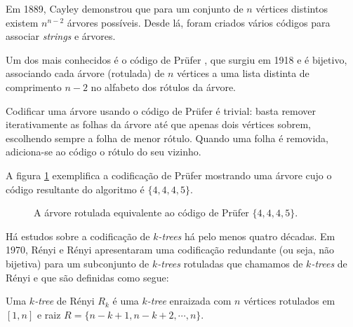 Em 1889, Cayley \cite{cayley} demonstrou que para um conjunto de $n$ vértices distintos existem $n^{n-2}$ árvores possíveis. Desde lá, foram criados vários códigos para associar \emph{strings} e árvores.

Um dos mais conhecidos é o código de Prüfer \cite{prufer}, que surgiu em 1918 e é bijetivo, associando cada árvore (rotulada) de $n$ vértices a uma lista distinta de comprimento $n-2$ no alfabeto dos rótulos da árvore.

Codificar uma árvore usando o código de Prüfer é trivial: basta remover iterativamente as folhas da árvore até que apenas dois vértices sobrem, escolhendo sempre a folha de menor rótulo. Quando uma folha é removida, adiciona-se ao código o rótulo do seu vizinho.

A figura \ref{fig:prufer} exemplifica a codificação de Prüfer mostrando uma árvore cujo o código resultante do algoritmo é $\{4, 4, 4, 5\}$.

\begin{figure}
  \centering

  \caption{A árvore rotulada equivalente ao código de Prüfer $\{4, 4, 4, 5\}$.}
  \label{fig:prufer}
\end{figure}

\vspace{2em}

Há estudos sobre a codificação de \emph{$k$-trees} há pelo menos quatro décadas. Em 1970, Rényi e Rényi apresentaram uma codificação redundante (ou seja, não bijetiva) para um subconjunto de \emph{$k$-trees} rotuladas que chamamos de \emph{$k$-trees} de Rényi e que são definidas como segue:

\begin{definition}
  \cite{renyi} Uma \emph{$k$-tree} de Rényi $R_k$ é uma \emph{$k$-tree} enraizada com $n$ vértices rotulados em $[1, n]$ e raiz $R = \{n-k+1, n-k+2, \cdots, n\}$.
\end{definition}

